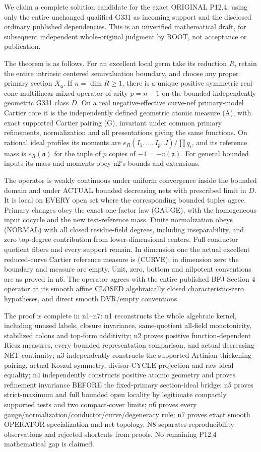 We claim a complete solution candidate for the exact ORIGINAL P12.4, using only the entire unchanged qualified G331 as incoming support and the disclosed ordinary published dependencies. This is an unverified mathematical draft, for subsequent independent whole-original judgment by ROOT, not acceptance or publication.

The theorem is as follows. For an excellent local germ take its reduction \(R\), retain the entire intrinsic centered semivaluation boundary, and choose any proper primary section \(X_{\mathfrak a}\). If \(n=\dim R\ge1\), there is a unique positive symmetric real-cone multilinear mixed operator of arity \(p=n-1\) on the bounded independently geometric G331 class \(D\). On a real negative-effective curve-nef primary-model Cartier core it is the independently defined geometric atomic measure (A), with exact supported Cartier pairing (G), invariant under common primary refinements, normalization and all presentations giving the same functions. On rational ideal profiles its moments are \(e_R(I_1,\ldots,I_p,J)/\prod q_i\), and its reference mass is \(e_R(\mathfrak a)\) for the tuple of \(p\) copies of \(-1=-v(\mathfrak a)\). For general bounded inputs its mass and moments obey n2's bounds and extensions.

The operator is weakly continuous under uniform convergence inside the bounded domain and under ACTUAL bounded decreasing nets with prescribed limit in \(D\). It is local on EVERY open set where the corresponding bounded tuples agree. Primary changes obey the exact one-factor law (GAUGE), with the homogeneous input cocycle and the new test-reference mass. Finite normalization obeys (NORMAL) with all closed residue-field degrees, including inseparability, and zero top-degree contribution from lower-dimensional centers. Full conductor quotient fibers and every support remain. In dimension one the actual excellent reduced-curve Cartier reference measure is (CURVE); in dimension zero the boundary and measure are empty. Unit, zero, bottom and nilpotent conventions are as proved in n6. The operator agrees with the entire published BFJ Section 4 operator at its smooth affine CLOSED algebraically closed characteristic-zero hypotheses, and direct smooth DVR/empty conventions.

The proof is complete in n1--n7: n1 reconstructs the whole algebraic kernel, including unused labels, closure invariance, same-quotient all-field monotonicity, stabilized colons and top-form additivity; n2 proves positive function-dependent Riesz measures, every bounded representation comparison, and actual decreasing-NET continuity; n3 independently constructs the supported Artinian-thickening pairing, actual Koszul symmetry, divisor-CYCLE projection and raw ideal equality; n4 independently constructs positive atomic geometry and proves refinement invariance BEFORE the fixed-primary section-ideal bridge; n5 proves strict-maximum and full bounded open locality by legitimate compactly supported tests and two compact-cover limits; n6 proves every gauge/normalization/conductor/curve/degeneracy rule; n7 proves exact smooth OPERATOR specialization and net topology. N8 separates reproducibility observations and rejected shortcuts from proofs. No remaining P12.4 mathematical gap is claimed.

